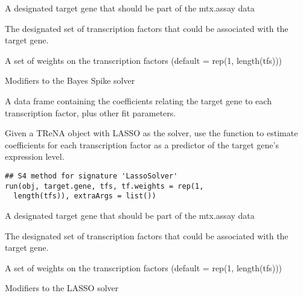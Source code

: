 \documentclass[a4paper]{book}
\begin{document}
%
\begin{Arguments}
\begin{ldescription}
\item[\code{target.gene}] A designated target gene that should be part of the mtx.assay data

\item[\code{tfs}] The designated set of transcription factors that could be associated with the target gene.

\item[\code{tf.weights}] A set of weights on the transcription factors (default = rep(1, length(tfs)))

\item[\code{extraArgs}] Modifiers to the Bayes Spike solver
\end{ldescription}
\end{Arguments}
%
\begin{Value}
A data frame containing the coefficients relating the target gene to each transcription factor, plus other fit parameters.
\end{Value}
%
\begin{SeeAlso}\relax
{}
\end{SeeAlso}
%
\begin{Description}\relax
Given a TReNA object with LASSO as the solver, use the  function to estimate coefficients
for each transcription factor as a predictor of the target gene's expression level.
\end{Description}
%
\begin{Usage}
\begin{verbatim}
## S4 method for signature 'LassoSolver'
run(obj, target.gene, tfs, tf.weights = rep(1,
  length(tfs)), extraArgs = list())
\end{verbatim}
\end{Usage}
%
\begin{Arguments}
\begin{ldescription}
\item[\code{target.gene}] A designated target gene that should be part of the mtx.assay data

\item[\code{tfs}] The designated set of transcription factors that could be associated with the target gene.

\item[\code{tf.weights}] A set of weights on the transcription factors (default = rep(1, length(tfs)))

\item[\code{extraArgs}] Modifiers to the LASSO solver
\end{ldescription}
\end{Arguments}
\end{document}
